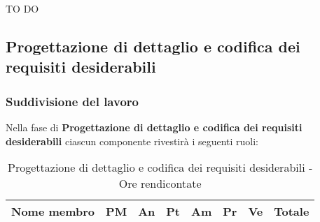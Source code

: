 		\noindent
		TO DO
		
	
	\subsection{Progettazione di dettaglio e codifica dei requisiti desiderabili} %
	\label{sub:progettazione_di_dettaglio_e_codifica_dei_requisiti_desiderabili}
		\subsubsection{Suddivisione del lavoro} %
		\label{ssub:suddivisione_del_lavoro}
		Nella fase di \textbf{Progettazione di dettaglio e codifica dei requisiti desiderabili} ciascun componente rivestirà i seguenti ruoli: \\
			\begin{table}[!h]
				\begin{center}
					\begin{tabularx}{0.9\textwidth}{|l|l|l|l|l|l|l|X|}
						\hline
						\textbf{Nome membro} & \textbf{PM} & \textbf{An} & \textbf{Pt} & \textbf{Am} & \textbf{Pr} & \textbf{Ve} & \textbf{Totale} \\
						\hline
					
						\hline		
					\end{tabularx}
				\end{center}
			\caption{Progettazione di dettaglio e codifica dei requisiti desiderabili - Ore rendicontate}
			\end{table}
		
